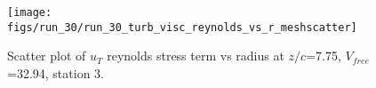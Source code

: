 \begin{figure}[H]
\centering
\texttt{[image: figs/run\_30/run\_30\_turb\_visc\_reynolds\_vs\_r\_meshscatter]}
\caption{Scatter plot of $
u_T$ reynolds stress term vs radius at $z/c$=7.75, $V_{free}$=32.94, station 3.}
\label{fig:run_30_turb_visc_reynolds_vs_r_meshscatter}
\end{figure}


